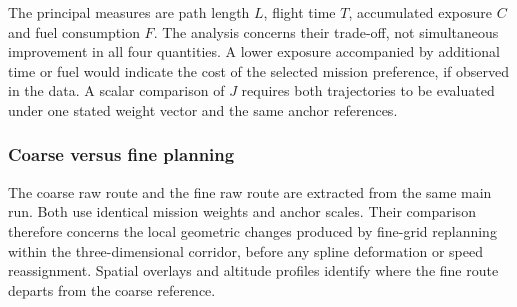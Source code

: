 \documentclass[preprint,12pt]{elsarticle}
\begin{document}
The principal measures are path length $L$, flight time $T$, accumulated
exposure $C$ and fuel consumption $F$. The analysis concerns their
trade-off, not simultaneous improvement in all four quantities. A lower
exposure accompanied by additional time or fuel would indicate the cost
of the selected mission preference, if observed in the data. A scalar
comparison of $J$ requires both trajectories to be evaluated under one
stated weight vector and the same anchor references.


\subsubsection{Coarse versus fine planning}
\label{sec:resolution_comparison}

The coarse raw route and the fine raw route are extracted from the same
main run. Both use identical mission weights and anchor scales. Their
comparison therefore concerns the local geometric changes produced by
fine-grid replanning within the three-dimensional corridor, before any
spline deformation or speed reassignment. Spatial overlays and altitude
profiles identify where the fine route departs from the coarse reference.
\end{document}
